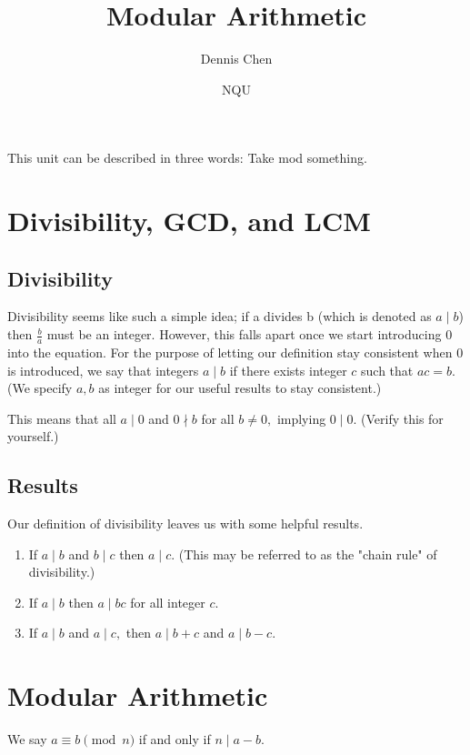 \documentclass[mast]{lucky}
\title{Modular Arithmetic}
\author{Dennis Chen}
\date{NQU}
\begin{document}
\maketitle

This unit can be described in three words: Take mod something.

\section{Divisibility, GCD, and LCM}
\subsection{Divisibility}
Divisibility seems like such a simple idea; if a divides b (which is denoted as $a\mid b$) then $\frac{b}{a}$ must be an integer. However, this falls apart once we start introducing $0$ into the equation. For the purpose of letting our definition stay consistent when $0$ is introduced, we say that integers $a\mid b$ if there exists integer $c$ such that $ac=b.$ (We specify $a,b$ as integer for our useful results to stay consistent.)

This means that all $a\mid 0$ and $0\nmid b$ for all $b\neq 0,$ implying $0\mid 0.$ (Verify this for yourself.)
\subsection{Results}
Our definition of divisibility leaves us with some helpful results.
\begin{fact}
\hfill
\begin{enumerate}
    \item If $a\mid b$ and $b\mid c$ then $a\mid c.$ (This may be referred to as the "chain rule" of divisibility.)
    
    \item If $a\mid b$ then $a\mid bc$ for all integer $c.$
    
    \item If $a\mid b$ and $a\mid c,$ then $a\mid b+c$ and $a\mid b-c.$
\end{enumerate}
\end{fact}

\section{Modular Arithmetic}
\begin{defi}
We say $a\equiv b\pmod {n}$ if and only if $n\mid a-b.$
\end{defi}
\end{document}
